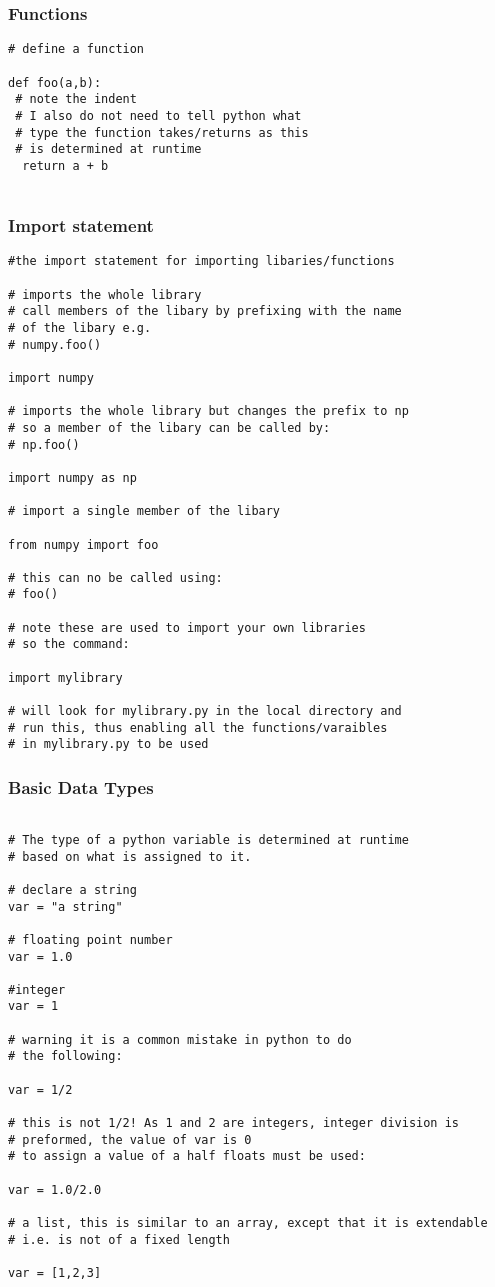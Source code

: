 \documentclass[11pt,a4paper]{article}
\begin{document}
\subsubsection{Functions}
\begin{verbatim}
# define a function

def foo(a,b):
 # note the indent
 # I also do not need to tell python what
 # type the function takes/returns as this
 # is determined at runtime
  return a + b 
  
\end{verbatim}

\subsubsection{Import statement}
\begin{verbatim}
#the import statement for importing libaries/functions

# imports the whole library
# call members of the libary by prefixing with the name
# of the libary e.g.
# numpy.foo()

import numpy

# imports the whole library but changes the prefix to np
# so a member of the libary can be called by:
# np.foo()
 
import numpy as np

# import a single member of the libary

from numpy import foo

# this can no be called using:
# foo()

# note these are used to import your own libraries
# so the command:

import mylibrary

# will look for mylibrary.py in the local directory and 
# run this, thus enabling all the functions/varaibles
# in mylibrary.py to be used

\end{verbatim}

\subsubsection{Basic Data Types}
\begin{verbatim}

# The type of a python variable is determined at runtime
# based on what is assigned to it.

# declare a string
var = "a string"

# floating point number
var = 1.0

#integer
var = 1

# warning it is a common mistake in python to do
# the following:

var = 1/2

# this is not 1/2! As 1 and 2 are integers, integer division is
# preformed, the value of var is 0
# to assign a value of a half floats must be used:

var = 1.0/2.0

# a list, this is similar to an array, except that it is extendable
# i.e. is not of a fixed length

var = [1,2,3]

\end{verbatim}
\end{document}
